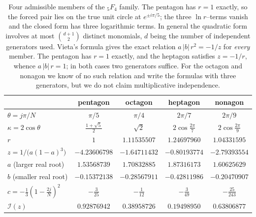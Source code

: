 \documentclass[11pt]{article}
\theoremstyle{definition}
\begin{document}
\begin{table}[H]
\centering
\renewcommand{\arraystretch}{1.3}
\begin{tabular}{lcccc}
\toprule
 & pentagon & octagon & heptagon & nonagon \\
\midrule
$\theta=j\pi/N$        & $\pi/5$ & $\pi/4$ & $2\pi/7$ & $2\pi/9$ \\
$\kappa=2\cos\theta$   & $\tfrac{1+\sqrt5}{2}$ & $\sqrt2$ & $2\cos\tfrac{2\pi}{7}$ & $2\cos\tfrac{2\pi}{9}$ \\
$r$                    & $1$ & $1.11535507$ & $1.24697960$ & $1.04331595$ \\
$z=1/\big(a(1-a)^3\big)$ & $-4.23606798$ & $-1.64711432$ & $-0.80193774$ & $-2.79393554$ \\
$a$ (larger real root) & $1.53568739$ & $1.70832885$ & $1.87316173$ & $1.60625629$ \\
$b$ (smaller real root)& $-0.15372138$ & $-0.28567911$ & $-0.42811986$ & $-0.20470907$ \\
$c=-\tfrac13(1-\tfrac{2j}{N})^2$ & $-\tfrac{3}{25}$ & $-\tfrac1{12}$ & $-\tfrac3{49}$ & $-\tfrac{25}{243}$ \\
$\mathcal{I}(z)$       & $0.92876942$ & $0.38958726$ & $0.19498950$ & $0.63806877$ \\
\bottomrule
\end{tabular}
\caption{Four admissible members of the ${}_5F_4$ family. The pentagon has $r=1$ exactly, so the
forced pair lies on the true unit circle at $e^{\pm i\pi/5}$; the three $\ln r$--terms vanish and the
closed form has three logarithmic terms. In general the quadratic form involves at most
$\binom{d+1}{2}$ distinct monomials, $d$ being the number of independent generators used. Vieta's
formula gives the exact relation $a\,|b|\,r^2=-1/z$ for \emph{every} member. The pentagon has $r=1$
exactly, and the heptagon satisfies $z=-1/r$, whence $a\,|b|\,r=1$; in both cases two generators
suffice. For the octagon and nonagon we know of no such relation and write the formulas with three
generators, but we do not claim multiplicative independence.}
\label{tab:main}
\end{table}
\end{document}
